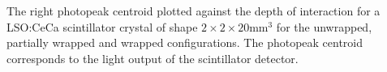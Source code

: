 \label{fig:lightoutput-20} The right photopeak centroid plotted against the depth of interaction for a LSO:CeCa scintillator crystal of shape $2\times2\times20$mm$^3$ for the unwrapped, partially wrapped and wrapped configurations. The photopeak centroid corresponds to the light output of the scintillator detector.